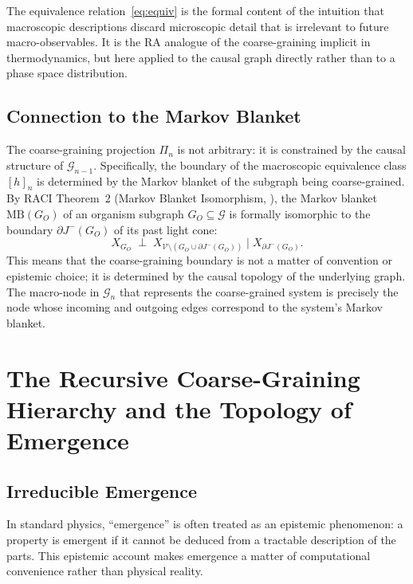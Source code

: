 \documentclass[11pt,a4paper]{article}
\theoremstyle{remark}
\newcommand{\MB}{\mathrm{MB}}
\newcommand{\GG}{\mathcal{G}}
\newcommand{\VV}{\mathcal{V}}
\begin{document}
The equivalence relation~\eqref{eq:equiv} is the formal content of the intuition
that macroscopic descriptions discard microscopic detail that is irrelevant to
future macro-observables. It is the RA analogue of the coarse-graining implicit in
thermodynamics, but here applied to the causal graph directly rather than to a
phase space distribution.

\subsection{Connection to the Markov Blanket}

The coarse-graining projection $\Pi_n$ is not arbitrary: it is constrained by the
causal structure of $\GG_{n-1}$. Specifically, the boundary of the macroscopic
equivalence class $[h]_n$ is determined by the Markov blanket of the subgraph
being coarse-grained. By RACI Theorem~2 (Markov Blanket Isomorphism,
\citep{Sandeman2026c}), the Markov blanket $\MB(G_O)$ of an organism subgraph
$G_O \subseteq \GG$ is formally isomorphic to the boundary $\partial J^-(G_O)$
of its past light cone:
\begin{equation}
  X_{G_O} \;\perp\; X_{\VV \setminus (G_O \cup \partial J^-(G_O))}
  \;\Big|\; X_{\partial J^-(G_O)}.
\end{equation}
This means that the coarse-graining boundary is not a matter of convention or
epistemic choice; it is determined by the causal topology of the underlying graph.
The macro-node in $\GG_n$ that represents the coarse-grained system is precisely
the node whose incoming and outgoing edges correspond to the system's Markov
blanket.

\section{The Recursive Coarse-Graining Hierarchy and the Topology of Emergence}
\label{sec:hierarchy}

\subsection{Irreducible Emergence}

In standard physics, ``emergence'' is often treated as an epistemic phenomenon:
a property is emergent if it cannot be deduced from a tractable description of
the parts. This epistemic account makes emergence a matter of computational
convenience rather than physical reality.
\end{document}
